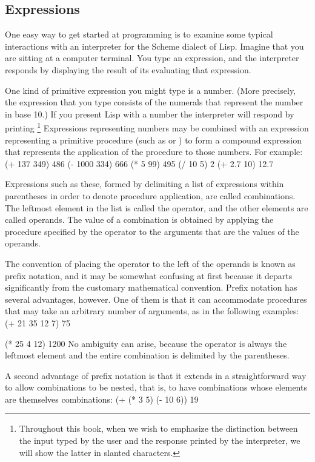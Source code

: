 \subsection{Expressions}

One easy way to get started at programming is
to examine some typical interactions with an interpreter for the Scheme dialect of Lisp.
Imagine that you are sitting at a computer terminal.
You type an expression, and the interpreter responds by displaying the result of its evaluating that expression.

One kind of primitive expression you might type is a number.
(More precisely, the expression that you type consists of the numerals that represent the number in base 10.)
If you present Lisp with a number
\stopcode
the interpreter will respond by printing
\footnote{%
   Throughout this book,
   when we wish to emphasize the distinction between the input typed by the user
   and the response printed by the interpreter,
   we will show the latter in slanted characters.
}
\stopcode
Expressions representing numbers may be combined with an expression
representing a primitive procedure (such as \exp{+} or \exp{*}) to form a compound expression
that represents the application of the procedure to those numbers.
For example:
\startcode
(+ 137 349)
486
(- 1000 334)
666
(* 5 99)
495
(/ 10 5)
2
(+ 2.7 10)
12.7
\stopcode

Expressions such as these,
formed by delimiting a list of expressions within parentheses in order to denote procedure application,
are called combinations.
The leftmost element in the list is called the operator,
and the other elements are called operands.
The value of a combination is obtained by applying the procedure specified by the operator
to the arguments that are the values of the operands.

The convention of placing the operator to the left of the operands is known as prefix notation,
and it may be somewhat confusing at first
because it departs significantly from the customary mathematical convention.
Prefix notation has several advantages, however.
One of them is that it can accommodate procedures that may take an arbitrary number of arguments,
as in the following examples:
\startcode
(+ 21 35 12 7)
75

(* 25 4 12)
1200
\stopcode
No ambiguity can arise,
because the operator is always the leftmost element
and the entire combination is delimited by the parentheses.

A second advantage of prefix notation is
that it extends in a straightforward way to allow combinations to be nested,
that is, to have combinations whose elements are themselves combinations:
\startcode
(+ (* 3 5) (- 10 6))
19
\stopcode

